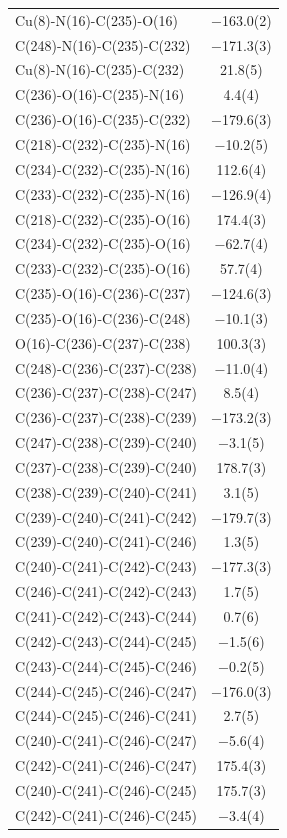 \begin{center}
{\begin{supertabular}{p{1.8in}c}
Cu(8)-N(16)-C(235)-O(16)&$-$163.0(2)\\
C(248)-N(16)-C(235)-C(232)&$-$171.3(3)\\
Cu(8)-N(16)-C(235)-C(232)&21.8(5)\\
C(236)-O(16)-C(235)-N(16)&4.4(4)\\
C(236)-O(16)-C(235)-C(232)&$-$179.6(3)\\
C(218)-C(232)-C(235)-N(16)&$-$10.2(5)\\
C(234)-C(232)-C(235)-N(16)&112.6(4)\\
C(233)-C(232)-C(235)-N(16)&$-$126.9(4)\\
C(218)-C(232)-C(235)-O(16)&174.4(3)\\
C(234)-C(232)-C(235)-O(16)&$-$62.7(4)\\
C(233)-C(232)-C(235)-O(16)&57.7(4)\\
C(235)-O(16)-C(236)-C(237)&$-$124.6(3)\\
C(235)-O(16)-C(236)-C(248)&$-$10.1(3)\\
O(16)-C(236)-C(237)-C(238)&100.3(3)\\
C(248)-C(236)-C(237)-C(238)&$-$11.0(4)\\
C(236)-C(237)-C(238)-C(247)&8.5(4)\\
C(236)-C(237)-C(238)-C(239)&$-$173.2(3)\\
C(247)-C(238)-C(239)-C(240)&$-$3.1(5)\\
C(237)-C(238)-C(239)-C(240)&178.7(3)\\
C(238)-C(239)-C(240)-C(241)&3.1(5)\\
C(239)-C(240)-C(241)-C(242)&$-$179.7(3)\\
C(239)-C(240)-C(241)-C(246)&1.3(5)\\
C(240)-C(241)-C(242)-C(243)&$-$177.3(3)\\
C(246)-C(241)-C(242)-C(243)&1.7(5)\\
C(241)-C(242)-C(243)-C(244)&0.7(6)\\
C(242)-C(243)-C(244)-C(245)&$-$1.5(6)\\
C(243)-C(244)-C(245)-C(246)&$-$0.2(5)\\
C(244)-C(245)-C(246)-C(247)&$-$176.0(3)\\
C(244)-C(245)-C(246)-C(241)&2.7(5)\\
C(240)-C(241)-C(246)-C(247)&$-$5.6(4)\\
C(242)-C(241)-C(246)-C(247)&175.4(3)\\
C(240)-C(241)-C(246)-C(245)&175.7(3)\\
C(242)-C(241)-C(246)-C(245)&$-$3.4(4)\\

\end{supertabular}}
\end{center}

